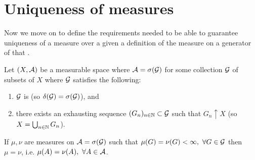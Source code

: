 \section{Uniqueness of measures}

Now we move on to define the requirements needed to be able to guarantee uniqueness of a measure over a \siga given a definition of the measure on a generator of that \siga.

\begin{thm}
	\label{thm:uniqueness-measures}
	Let $(X, \mathcal{A})$ be a measurable space where $\mathcal{A} = \sigma(\mathcal{G})$ for some collection $\mathcal{G}$ of subsets of $X$ where $\mathcal{G}$ satisfies the following:
	\begin{enumerate}
		\item $\mathcal{G}$ is \istable (so $\delta(\mathcal{G}) = \sigma(\mathcal{G})$), and
		\item there exists an exhausting sequence $(G_n)_{n \in \mathbb{N}} \subset \mathcal{G}$ such that $G_n\uparrow X$ (so $X = \bigcup_{n\in\mathbb{N}}G_n$). 
	\end{enumerate}

	If $\mu, \nu$ are measures on $\mathcal{A} = \sigma(\mathcal{G})$ such that $\mu(G) = \nu(G) < \infty,\ \forall G \in \calG$ then $\mu = \nu$, i.e. $\mu(A) = \nu(A),\ \forall A \in \mathcal{A}$.
\end{thm}

